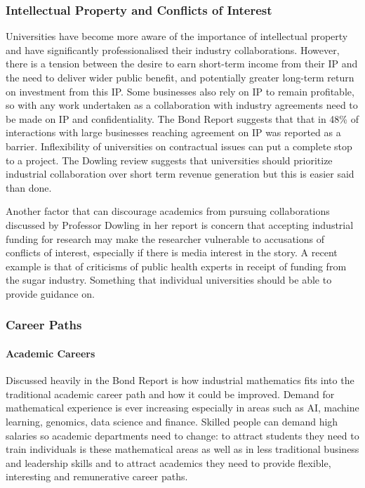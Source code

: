 \documentclass[11pt]{article} %
\begin{document}
	\subsubsection{Intellectual Property and Conflicts of Interest} 
	Universities have  become more aware of the importance of intellectual property and have significantly professionalised their industry collaborations. However, there is a tension between the desire to earn short-term income from their IP and the need to deliver wider public benefit, and potentially greater long-term return on investment from this IP. Some businesses also rely on IP to remain profitable, so with any work undertaken as a collaboration with industry agreements need to be made on IP and confidentiality. The Bond Report \cite{Bond} suggests that that in 48\% of interactions with large businesses reaching agreement on IP was reported as a barrier.   Inflexibility of universities on contractual issues can put a complete stop to a project.  The Dowling review \cite{DOWLING2015} suggests that universities should prioritize industrial collaboration over short term revenue generation but this is easier said than done. 
	
	Another factor that can discourage academics from pursuing collaborations  discussed by Professor Dowling in her report \cite{DOWLING2015} is concern that accepting industrial funding for research may make the researcher vulnerable to accusations of conflicts of interest, especially if there is media interest in the story. A recent example is that of  criticisms of public health experts in receipt of funding from the sugar industry. Something that individual universities should be able to provide guidance on. 
	\subsubsection{Career Paths} 
	\paragraph{Academic Careers}
	
	
	Discussed heavily in the Bond Report is  how industrial mathematics fits into the traditional academic career path and how it could be improved. Demand for mathematical experience is ever increasing especially in areas such as AI, machine learning, genomics, data science and finance. Skilled people can demand high salaries so academic departments need to change: to attract students they need to train individuals is these mathematical areas as well as in less traditional business and leadership skills and to attract academics they need to provide flexible, interesting  and remunerative career paths.
	
\end{document}
